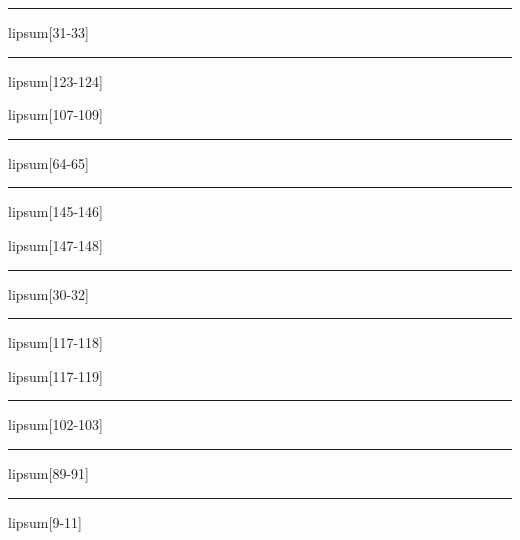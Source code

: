 \documentclass[11pt,a4paper]{article}
\begin{document}
\begin{simplewrap}
  \textcolor{cyan!35}{\rule{5.1cm}{9.4cm}}
\end{simplewrap}
lipsum[31-33]

\begin{simplewrap}
  \textcolor{violet!33}{\rule{4.8cm}{3.8cm}}
\end{simplewrap}
lipsum[123-124]

lipsum[107-109]

\begin{simplewrap}
  \textcolor{magenta!40}{\rule{5.3cm}{8.4cm}}
\end{simplewrap}
lipsum[64-65]

\begin{simplewrap}
  \textcolor{green!43}{\rule{4.3cm}{7.6cm}}
\end{simplewrap}
lipsum[145-146]

lipsum[147-148]

\begin{simplewrap}
  \textcolor{magenta!19}{\rule{3.5cm}{8.8cm}}
\end{simplewrap}
lipsum[30-32]

\begin{simplewrap}
  \textcolor{red!15}{\rule{5.7cm}{5.6cm}}
\end{simplewrap}
lipsum[117-118]

lipsum[117-119]

\begin{simplewrap}
  \textcolor{blue!45}{\rule{4.4cm}{8.5cm}}
\end{simplewrap}
lipsum[102-103]

\begin{simplewrap}
  \textcolor{red!57}{\rule{3.7cm}{2.6cm}}
\end{simplewrap}
lipsum[89-91]

\begin{simplewrap}
  \textcolor{magenta!13}{\rule{5.8cm}{2.6cm}}
\end{simplewrap}
lipsum[9-11]
\end{document}
